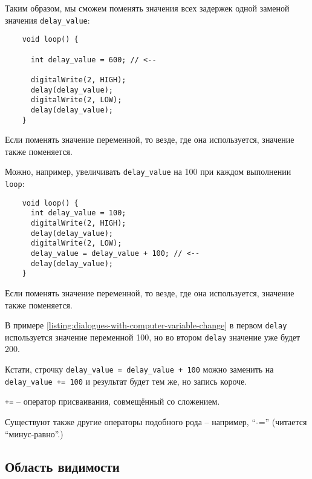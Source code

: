 \documentclass[../sparc.tex]{subfiles}
\begin{document}
Таким образом, мы сможем поменять значения всех задержек одной заменой значения
\texttt{delay\_value}:

\begin{listing}[ht]
  \begin{verbatim}
    void loop() {

      int delay_value = 600; // <--

      digitalWrite(2, HIGH);
      delay(delay_value);
      digitalWrite(2, LOW);
      delay(delay_value);
    }
  \end{verbatim}
  \label{listing:dialogues-with-computer-variable-set-value}
  \caption{Если поменять значение переменной, то везде, где она используется,
    значение также поменяется.}
\end{listing}

Можно, например, увеличивать \texttt{delay\_value} на 100 при каждом выполнении
\texttt{loop}:

\begin{listing}[ht]
  \begin{verbatim}
    void loop() {
      int delay_value = 100;
      digitalWrite(2, HIGH);
      delay(delay_value);
      digitalWrite(2, LOW);
      delay_value = delay_value + 100; // <--
      delay(delay_value);
    }
  \end{verbatim}
  \label{listing:dialogues-with-computer-variable-change}
  \caption{Если поменять значение переменной, то везде, где она используется,
    значение также поменяется.}
\end{listing}

В примере \ref{listing:dialogues-with-computer-variable-change} в первом
\texttt{delay} используется значение переменной 100, но во втором \texttt{delay}
значение уже будет 200.

Кстати, строчку \texttt{delay\_value = delay\_value + 100} можно заменить на
\texttt{delay\_value += 100} и результат будет тем же, но запись короче.

\texttt{+=} -- оператор присваивания, совмещённый со сложением.

Существуют также другие операторы подобного рода -- например, ``-='' (читается
``минус-равно''.)

\subsection{Область видимости}
\end{document}

